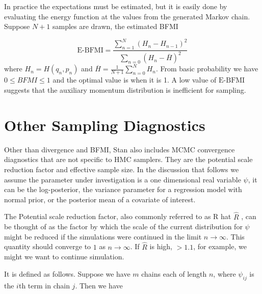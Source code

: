 \documentclass[12pt]{report}
\begin{document}
 In practice the expectations must be estimated, but
it is easily done by evaluating the energy function at the values from the
generated Markov chain. Suppose $N+1$ samples are drawn, the estimated BFMI 

\[ \text{E-BFMI} = \frac{\sum_{n=1}^N(H_n-H_{n-1})^2}{\sum_{n=0}(H_n-\bar{H})^2} \]
where $H_n = H(q_n,p_n)$ and $\overline{H}=\frac{1}{N+1}\sum_{n=0}^N H_n$. From basic
probability we have $0 \le BFMI \le 1 $ and the optimal value is when it is
1. A low value of $\text{E-BFMI}$ suggests that the auxiliary momentum distribution is
inefficient for sampling. 

 
\section{Other Sampling Diagnostics}

Other than divergence and BFMI, Stan also includes MCMC convergence diagnostics that are not specific to HMC samplers. They are the potential scale reduction factor and effective sample size. In the discussion that follows we assume the parameter under investigation is a one dimensional real variable $\psi$, it can be the log-posterior, the variance parameter for a regression model with normal prior, or the posterior mean of a covariate of interest.


The Potential scale reduction factor, also commonly referred to as R hat $\hat{R}$ , can be thought of as the factor by which the scale of the current distribution for $\psi$ might be reduced if the simulations were continued in the limit $n \rightarrow \infty$. This quantity should converge to $1$ as $n \rightarrow \infty$. If $\hat{R}$ is high, $ > 1.1 $, for example, we might we want to continue simulation. 

It is defined as follows. Suppose we have $m$ chains each of length $n$, where $\psi_{ij}$ is the $i$th term in chain $j$. Then we have 
\end{document}
